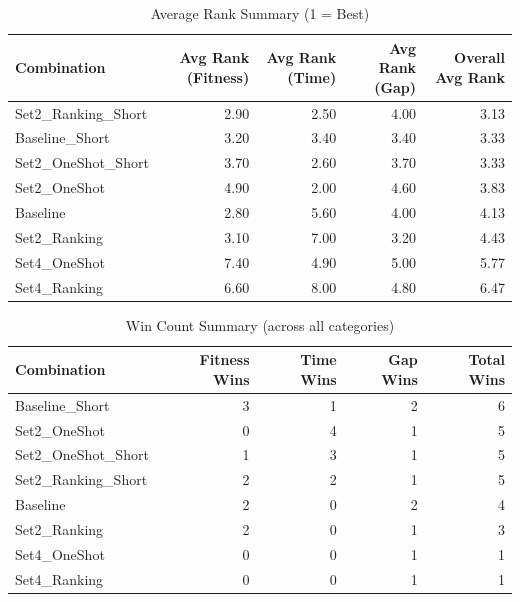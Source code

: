 \documentclass{article}
\begin{document}
\begin{table}[htbp]
\centering
\caption{Average Rank Summary (1 = Best)}
\label{tab:avg_rank_summary}
\begin{tabular}{lrrrr}
\toprule
Combination & Avg Rank (Fitness) & Avg Rank (Time) & Avg Rank (Gap) & Overall Avg Rank \\
\midrule
Set2\_Ranking\_Short & 2.90 & 2.50 & 4.00 & 3.13 \\
Baseline\_Short & 3.20 & 3.40 & 3.40 & 3.33 \\
Set2\_OneShot\_Short & 3.70 & 2.60 & 3.70 & 3.33 \\
Set2\_OneShot & 4.90 & 2.00 & 4.60 & 3.83 \\
Baseline & 2.80 & 5.60 & 4.00 & 4.13 \\
Set2\_Ranking & 3.10 & 7.00 & 3.20 & 4.43 \\
Set4\_OneShot & 7.40 & 4.90 & 5.00 & 5.77 \\
Set4\_Ranking & 6.60 & 8.00 & 4.80 & 6.47 \\
\bottomrule
\end{tabular}
\end{table}

\begin{table}[htbp]
\centering
\caption{Win Count Summary (across all categories)}
\label{tab:win_count_summary}
\begin{tabular}{lrrrr}
\toprule
Combination & Fitness Wins & Time Wins & Gap Wins & Total Wins \\
\midrule
Baseline\_Short & 3 & 1 & 2 & 6 \\
Set2\_OneShot & 0 & 4 & 1 & 5 \\
Set2\_OneShot\_Short & 1 & 3 & 1 & 5 \\
Set2\_Ranking\_Short & 2 & 2 & 1 & 5 \\
Baseline & 2 & 0 & 2 & 4 \\
Set2\_Ranking & 2 & 0 & 1 & 3 \\
Set4\_OneShot & 0 & 0 & 1 & 1 \\
Set4\_Ranking & 0 & 0 & 1 & 1 \\
\bottomrule
\end{tabular}
\end{table}
\end{document}
